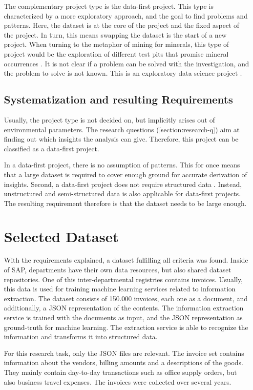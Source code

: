 	The complementary project type is the data-first project. This type is characterized by a more exploratory approach, and the goal to find problems and patterns. Here, the dataset is at the core of the project and the fixed aspect of the project. In turn, this means swapping the dataset is the start of a new project. When turning to the metaphor of mining for minerals, this type of project would be the exploration of different test pits that promise mineral occurrences \cite[p.~3051]{dataScienceProjectTypes}. It is not clear if a problem can be solved with the investigation, and the problem to solve is not known. This is an exploratory data science project \cite[p.~3051]{dataScienceProjectTypes}.
	
	\subsection{Systematization and resulting Requirements}
	Usually, the project type is not decided on, but implicitly arises out of environmental parameters. The research questions (\ref{section:research-q}) aim at finding out which insights the analysis can give. Therefore, this project can be classified as a data-first project.

	In a data-first project, there is no assumption of patterns. This for once means that a large dataset is required to cover enough ground for accurate derivation of insights. Second, a data-first project does not require structured data \cite{srivastavaDataMining}. Instead, unstructured and semi-structured data is also applicable for data-first projects. The resulting requirement therefore is that the dataset needs to be large enough.
	
	
	\section{Selected Dataset}
	\label{section:selected-dataset}
	With the requirements explained, a dataset fulfilling all criteria was found. Inside of SAP, departments have their own data resources, but also shared dataset repositories. One of this inter-departmental registries contains invoices. Usually, this data is used for training machine learning services related to information extraction. The dataset consists of 150.000 invoices, each one as a document, and additionally, a \ac{JSON} representation of the contents.	The information extraction service is trained with the documents as input, and the \ac{JSON} representation as ground-truth for machine learning. The extraction service is able to recognize the information and transforms it into structured data.	
	
	For this research task, only the \ac{JSON} files are relevant. The invoice set contains information about the vendors, billing amounts and a descriptions of the goods. They mainly contain day-to-day transactions such as office supply orders, but also business travel expenses. The invoices were collected over several years.

	
	
